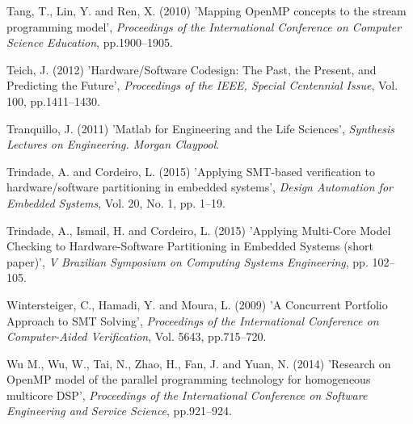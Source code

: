 \documentclass{doublecol-new}
\theoremstyle{TH}{
\newtheorem{lemma}{Lemma}
\newtheorem{theorem}[lemma]{Theorem}
\newtheorem{corrolary}[lemma]{Corrolary}
\newtheorem{conjecture}[lemma]{Conjecture}
\newtheorem{proposition}[lemma]{Proposition}
\newtheorem{claim}[lemma]{Claim}
\newtheorem{stheorem}[lemma]{Wrong Theorem}
\newtheorem{algorithm}{Algorithm}
}
\theoremstyle{THrm}{
\newtheorem{definition}{Definition}[section]
\newtheorem{question}{Question}[section]
\newtheorem{remark}{Remark}
\newtheorem{scheme}{Scheme}
}
\theoremstyle{THhit}{
\newtheorem{case}{Case}[section]
}
\begin{document}
\begin{thebibliography}{10}
Tang, T., Lin, Y. and Ren, X. (2010) 'Mapping OpenMP concepts to the stream programming model', {\it Proceedings of the International Conference on Computer Science Education}, pp.1900--1905.

Teich, J. (2012) 'Hardware/Software Codesign: The Past, the Present, and Predicting the Future', {\it Proceedings of the IEEE, Special Centennial Issue}, Vol. 100, pp.1411--1430.

Tranquillo, J. (2011) 'Matlab for Engineering and the Life Sciences', {\it Synthesis Lectures on Engineering. Morgan Claypool}.

Trindade, A. and Cordeiro, L. (2015) 'Applying SMT-based verification to hardware/software partitioning in embedded systems', {\it Design Automation for Embedded Systems}, Vol. 20, No. 1, pp. 1--19.

Trindade, A., Ismail, H. and Cordeiro, L. (2015) 'Applying Multi-Core Model Checking to Hardware-Software Partitioning in Embedded Systems (short paper)', {\it V Brazilian Symposium on Computing Systems Engineering}, pp. 102--105.

Wintersteiger, C., Hamadi, Y. and Moura, L. (2009) 'A Concurrent Portfolio Approach to SMT Solving', {\it Proceedings of the International Conference on Computer-Aided Verification}, Vol. 5643, pp.715--720.

Wu M., Wu, W., Tai, N., Zhao, H., Fan, J. and Yuan, N. (2014) 'Research on OpenMP model of the parallel programming technology for homogeneous multicore DSP', {\it Proceedings of the International Conference on Software Engineering and Service Science}, pp.921--924.

\end{thebibliography}
\end{document}
